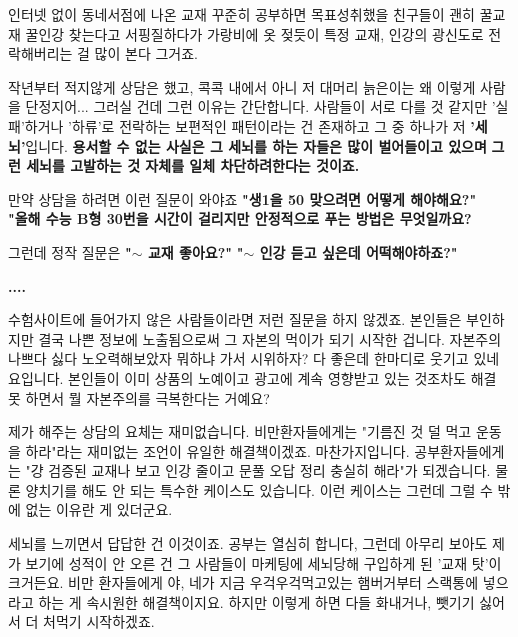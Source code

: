 인터넷 없이 동네서점에 나온 교재 꾸준히 공부하면 목표성취했을 친구들이
괜히 꿀교재 꿀인강 찾는다고 서핑질하다가 가랑비에 옷 젖듯이 특정 교재, 인강의 광신도로 전락해버리는 걸 많이 본다 그거죠.
\vspace{5mm}

작년부터 적지않게 상담은 했고, 콕콕 내에서 아니 저 대머리 늙은이는 왜 이렇게 사람을 단정지어... 그러실 건데
그런 이유는 간단합니다. 사람들이 서로 다를 것 같지만 '실패'하거나 '하류'로 전락하는 보편적인 패턴이라는 건 존재하고
그 중 하나가 저 \textbf{'세뇌'}입니다.
\textbf{용서할 수 없는 사실은 그 세뇌를 하는 자들은 많이 벌어들이고 있으며}
\textbf{그런 세뇌를 고발하는 것 자체를 일체 차단하려한다는 것이죠.}
\vspace{5mm}

만약 상담을 하려면 이런 질문이 와야죠
\textbf{"생1을 50 맞으려면 어떻게 해야해요?"    "올해 수능 B형 30번을 시간이 걸리지만 안정적으로 푸는 방법은 무엇일까요?}
\vspace{5mm}

그런데 정작 질문은
\textbf{"$\sim$ 교재 좋아요?"}
\textbf{"$\sim$ 인강 듣고 싶은데 어떡해야하죠?"}
\vspace{5mm}

\textbf{....}
\vspace{5mm}

수험사이트에 들어가지 않은 사람들이라면 저런 질문을 하지 않겠죠.
본인들은 부인하지만 결국 나쁜 정보에 노출됨으로써 그 자본의 먹이가 되기 시작한 겁니다.
자본주의 나쁘다 싫다 노오력해보았자 뭐하냐 가서 시위하자? 다 좋은데 한마디로 웃기고 있네요입니다.
본인들이 이미 상품의 노예이고 광고에 계속 영향받고 있는 것조차도 해결 못 하면서 뭘 자본주의를 극복한다는 거예요?
\vspace{5mm}

제가 해주는 상담의 요체는 재미없습니다.
비만환자들에게는 "기름진 것 덜 먹고 운동을 하라"라는 재미없는 조언이 유일한 해결책이겠죠.
마찬가지입니다. 공부환자들에게는 "걍 검증된 교재나 보고 인강 줄이고 문풀 오답 정리 충실히 해라"가 되겠습니다.
물론 양치기를 해도 안 되는 특수한 케이스도 있습니다. 이런 케이스는 그런데 그럴 수 밖에 없는 이유란 게 있더군요.
\vspace{5mm}

세뇌를 느끼면서 답답한 건 이것이죠.
공부는 열심히 합니다, 그런데 아무리 보아도 제가 보기에 성적이 안 오른 건
그 사람들이 마케팅에 세뇌당해 구입하게 된 '교재 탓'이 크거든요.
비만 환자들에게 야, 네가 지금 우걱우걱먹고있는 햄버거부터 스랙통에 넣으라고 하는 게 속시원한 해결책이지요.
하지만 이렇게 하면 다들 화내거나, 뺏기기 싫어서 더 처먹기 시작하겠죠.
\vspace{5mm}

